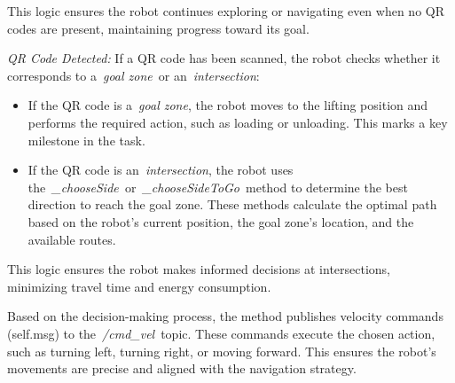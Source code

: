 \documentclass[a4paper,12pt]{extreport}
\begin{document}
This logic ensures the robot continues exploring or navigating even when
no QR codes are present, maintaining progress toward its goal.

\emph{QR Code Detected:} If a QR code has been scanned, the robot checks
whether it corresponds to a~\emph{goal zone}~or an~\emph{intersection}:

\begin{itemize}
\item
  If the QR code is a~\emph{goal zone}, the robot moves to the lifting
  position and performs the required action, such as loading or
  unloading. This marks a key milestone in the task.
\item
  If the QR code is an~\emph{intersection}, the robot uses
  the~\emph{\_chooseSide~}or~\emph{\_chooseSideToGo}~method to determine
  the best direction to reach the goal zone. These methods calculate the
  optimal path based on the robot's current position, the goal zone's
  location, and the available routes.
\end{itemize}

This logic ensures the robot makes informed decisions at intersections,
minimizing travel time and energy consumption.

Based on the decision-making process, the method publishes velocity
commands (self.msg) to the~\emph{/cmd\_vel}~topic. These commands
execute the chosen action, such as turning left, turning right, or
moving forward. This ensures the robot's movements are precise and
aligned with the navigation strategy.
\end{document}
